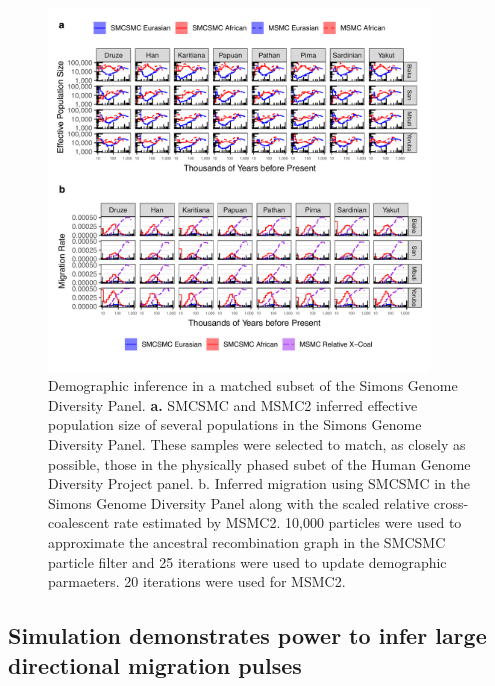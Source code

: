 \begin{figure}
  \centering
  \includegraphics[width=0.9\textwidth]{plot/subset_ne_mig.pdf}
  \caption[Demographic inference in a matched subset of the SGDP]{ Demographic inference in a matched subset of the Simons Genome Diversity Panel. {\bf a.} SMCSMC and MSMC2 inferred effective population size of several populations in the Simons Genome Diversity Panel. These samples were selected to match, as closely as possible, those in the physically phased subet of the Human Genome Diversity Project panel. {b.} Inferred migration using SMCSMC in the Simons Genome Diversity Panel along with the scaled relative cross-coalescent rate estimated by MSMC2.  10,000 particles were used to approximate the ancestral recombination graph in the SMCSMC particle filter and 25 iterations were used to update demographic parmaeters. 20 iterations were used for MSMC2.}
  \label{fig:hgdp_sgdp}
\end{figure}

\subsection{Simulation demonstrates power to infer large directional migration pulses}

